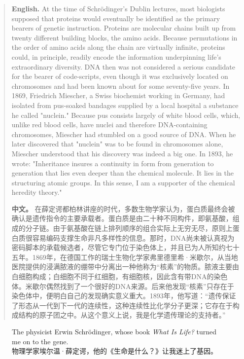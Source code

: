 \begin{quote}
\noindent\textbf{English.} At the time of Schrödinger's Dublin lectures, most biologists supposed that proteins would eventually be identified as the primary bearers of genetic instruction. Proteins are molecular chains built up from twenty different building blocks, the amino acids. Because permutations in the order of amino acids along the chain are virtually infinite, proteins could, in principle, readily encode the information underpinning life's extraordinary diversity. DNA then was not considered a serious candidate for the bearer of code-scripts, even though it was exclusively located on chromosomes and had been known about for some seventy-five years. In 1869, Friedrich Miescher, a Swiss biochemist working in Germany, had isolated from pus-soaked bandages supplied by a local hospital a substance he called "nuclein." Because pus consists largely of white blood cells, which, unlike red blood cells, have nuclei and therefore DNA-containing chromosomes, Miescher had stumbled on a good source of DNA. When he later discovered that "nuclein" was to be found in chromosomes alone, Miescher understood that his discovery was indeed a big one. In 1893, he wrote: "Inheritance insures a continuity in form from generation to generation that lies even deeper than the chemical molecule. It lies in the structuring atomic groups. In this sense, I am a supporter of the chemical heredity theory."

\smallskip
\noindent\textbf{中文。} 在薛定谔都柏林讲座的时代，多数生物学家认为，蛋白质最终会被确认是遗传指令的主要承载者。蛋白质是由二十种不同构件，即氨基酸，组成的分子链。由于氨基酸在链上排列顺序的组合实际上无穷无尽，原则上蛋白质很容易编码支撑生命非凡多样性的信息。那时，DNA尚未被认真视为密码脚本的承载候选者，尽管它专门位于染色体上，并且已为人所知约七十五年。1869年，在德国工作的瑞士生物化学家弗里德里希·米歇尔，从当地医院提供的浸满脓液的绷带中分离出一种他称为“核素”的物质。脓液主要由白细胞构成；白细胞不同于红细胞，有细胞核，因此含有带DNA的染色体。米歇尔偶然找到了一个很好的DNA来源。后来他发现“核素”只存在于染色体中，便明白自己的发现确实意义重大。1893年，他写道：“遗传保证了形态从一代到下一代的连续性，这种连续性比化学分子更深；它存在于构成结构的原子团之中。从这个意义上说，我是化学遗传理论的支持者。”
\end{quote}

\begin{figure}[htbp]
\centering
{}
\caption{The physicist Erwin Schrödinger, whose book \emph{What Is Life?} turned me on to the gene.\\物理学家埃尔温·薛定谔，他的《生命是什么？》让我迷上了基因。}
\end{figure}

